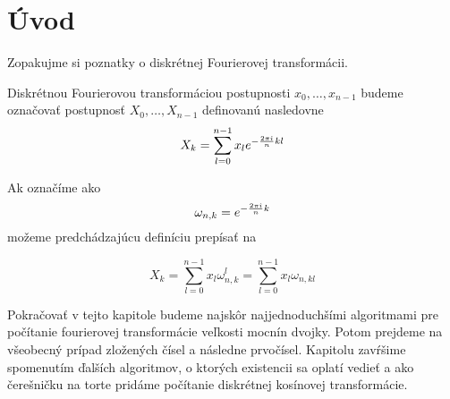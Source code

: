 \section{Úvod}

Zopakujme si poznatky o diskrétnej Fourierovej transformácii.
\begin{definicia}
    Diskrétnou Fourierovou transformáciou postupnosti $x_0, \dots,
    x_{n-1}$ budeme označovať postupnosť $X_0, \dots, X_{n-1}$
    definovanú nasledovne
    \begin{equation}
        X_k = \sum_{l=0}^{n-1} x_l e^{-\frac{2\pi\hat{\imath}}{n}kl}
        \label{eq:dft}
    \end{equation}
\label{def:dft}
\end{definicia}
Ak označíme  ako
\begin{equation}
    \omega_{n,k} = e^ { -\frac{2\pi \hat{\imath}}{n} k}
    \label{eq:omega}
\end{equation}
možeme predchádzajúcu definíciu prepísať na

\begin{equation}
    X_k = \sum_{l=0}^{n-1} x_l \omega_{n,k}^l =
          \sum_{l=0}^{n-1} x_l \omega_{n,kl}
    \label{eq:dft_omega}
\end{equation}

Pokračovať v tejto kapitole budeme najskôr najjednoduchšími
algoritmami pre počítanie fourierovej transformácie veľkosti mocnín
dvojky. Potom prejdeme na všeobecný prípad zložených čísel a následne
prvočísel. Kapitolu zavŕšime spomenutím ďalších algoritmov, o ktorých
existencii sa oplatí vedieť a ako čerešničku na torte pridáme
počítanie diskrétnej kosínovej transformácie.
